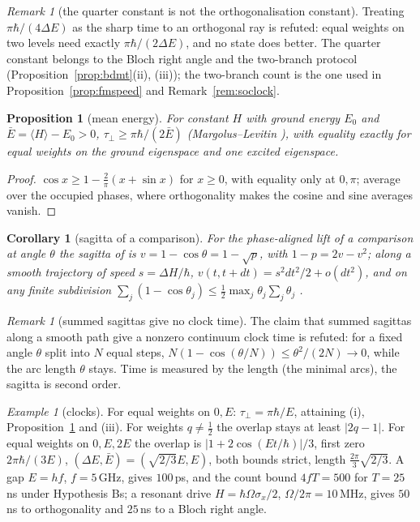 \documentclass[aps,pra,onecolumn,superscriptaddress,nofootinbib,10pt]{revtex4-2}
\newtheorem{proposition}[theorem]{Proposition}
\newtheorem{corollary}[theorem]{Corollary}
\theoremstyle{definition}
\theoremstyle{remark}
\newtheorem{remark}[theorem]{Remark}
\newtheorem{example}[theorem]{Example}
\begin{document}
\begin{remark}[the quarter constant is not the orthogonalisation constant]\label{rem:bdquarter}
Treating $\pi\hbar/(4\Delta E)$ as the sharp time to an orthogonal ray is refuted: equal weights on two levels need exactly
$\pi\hbar/(2\Delta E)$, and no state does better.  The quarter constant belongs to the Bloch right angle and the two-branch
protocol (Proposition~\ref{prop:bdmt}(ii), (iii)); the two-branch count is the one used in
Proposition~\ref{prop:fmspeed} and Remark~\ref{rem:soclock}.
\end{remark}

\begin{proposition}[mean energy]\label{prop:bdml}
For constant $H$ with ground energy $E_0$ and $\bar E=\langle H\rangle-E_0>0$, $\tau_\perp\ge\pi\hbar/(2\bar E)$ (Margolus--Levitin \cite{n4:ML}), with equality exactly for
equal weights on the ground eigenspace and one excited eigenspace.
\end{proposition}
\begin{proof}
$\cos x\ge1-\tfrac2\pi(x+\sin x)$ for $x\ge0$, with equality only at $0,\pi$; average over the occupied phases, where orthogonality makes the
cosine and sine averages vanish.
\end{proof}

\begin{corollary}[sagitta of a comparison]\label{cor:bdsagitta}
For the phase-aligned lift of a comparison at angle $\theta$ the sagitta of \cite[Prop.~7.1]{PaperI} is $v=1-\cos\theta=1-\sqrt p$, with
$1-p=2v-v^2$; along a smooth trajectory of speed $s=\Delta H/\hbar$, $v(t,t+dt)=s^2dt^2/2+o(dt^2)$, and on any finite subdivision
$\sum_j(1-\cos\theta_j)\le\tfrac12\max_j\theta_j\sum_j\theta_j$ \cite[Thm.~7.2(a)]{PaperI}.
\end{corollary}
\begin{remark}[summed sagittas give no clock time]\label{rem:bdsagitta}
The claim that summed sagittas along a smooth path give a nonzero continuum clock time is refuted: for a
fixed angle $\theta$ split into $N$ equal steps, $N(1-\cos(\theta/N))\le\theta^2/(2N)\to0$, while the arc length $\theta$ stays.  Time is
measured by the length (the minimal arcs), the sagitta is second order.
\end{remark}

\begin{example}[clocks]\label{ex:bdclocks}
For equal weights on $0,E$: $\tau_\perp=\pi\hbar/E$, attaining (i), Proposition~\ref{prop:bdml} and (iii).  For weights $q\ne\tfrac12$ the overlap stays at least $\lvert2q-1\rvert$.
For equal weights on $0,E,2E$ the overlap is $\lvert1+2\cos(Et/\hbar)\rvert/3$, first zero $2\pi\hbar/(3E)$, $(\Delta E,\bar E)=(\sqrt{2/3}E,E)$, both bounds strict, length $\tfrac{2\pi}3\sqrt{2/3}$.
A gap $E=hf$, $f=5$\,GHz, gives $100$\,ps, and the count bound $4fT=500$ for $T=25$\,ns under Hypothesis Bs; a resonant drive
$H=\hbar\Omega\sigma_x/2$, $\Omega/2\pi=10$\,MHz, gives $50$\,ns to orthogonality and $25$\,ns to a Bloch right angle.
\end{example}
\end{document}
